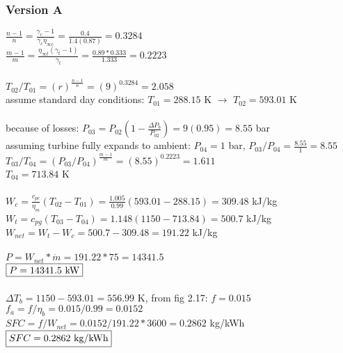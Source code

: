 \documentclass{article}
\begin{document}
\subsubsection*{Version A}
$\frac{n-1}{n}=\frac{\gamma_c-1}{\gamma_c \eta_{\infty c}}=\frac{0.4}{1.4(0.87)}=
0.3284$ \\
$\frac{m-1}{m}=\frac{\eta_{\infty t}(\gamma_t-1)}{\gamma_t}=\frac{0.89*0.333}{1.333}=
0.2223$ \\\\
$T_{02}/T_{01}=(r)^{\frac{n-1}{n}}=(9)^{0.3284}=2.058$ \\
assume standard day conditions: $T_{01}=288.15$ K $\rightarrow$ $T_{02}=593.01$ K\\\\
because of losses: $P_{03}=P_{02}(1-\frac{\Delta P_b}{P_{02}})=9(0.95)=8.55$ bar \\
assuming turbine fully expands to ambient: $P_{04}=1$ bar, $P_{03}/P_{04}=
\frac{8.55}{1}=8.55$ \\
$T_{03}/T_{04}=(P_{03}/P_{04})^{\frac{m-1}{m}}=(8.55)^{0.2223}=1.611$ \\
$T_{04}=713.84$ K \\\\
$W_{c}=\frac{c_{pc}}{\eta_m}(T_{02}-T_{01})=\frac{1.005}{0.99}(593.01-288.15)=
309.48$ kJ/kg \\
$W_{t}=c_{pg}(T_{03}-T_{04})=1.148(1150-713.84)=500.7$ kJ/kg \\
$W_{net}=W_{t}-W_{c}=500.7-309.48=191.22$ kJ/kg \\\\
$P=W_{net}*\dot{m}=191.22*75=14341.5$ \\
$\fbox{$P=14341.5$ kW}$ \\\\
$\Delta T_b=1150-593.01=556.99$ K, from fig 2.17: $f=0.015$ \\
$f_a=f/\eta_b=0.015/0.99=0.0152$ \\
$SFC=f/W_{net}=0.0152/191.22*3600=0.2862$ kg/kWh \\
$\fbox{$SFC=0.2862$ kg/kWh}$
\end{document}
